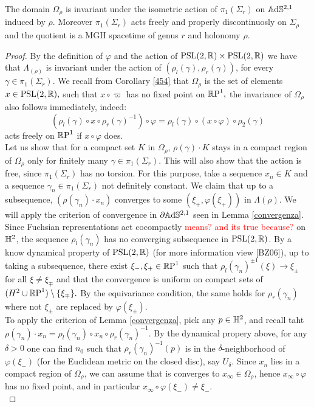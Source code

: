 \begin{proposition}\label{examplesgenustwo}
    The domain $\Omega_\rho$ is invariant under the isometric action of $\pi_1(\Sigma_r)$ on $\A^{2,1}$ induced by $\rho.$ Moreover $\pi_1(\Sigma_r)$ acts freely and properly discontinuosly on $\Sigma_\rho$ and the quotient is a MGH spacetime of genus $r$ and holonomy $\rho.$ 
\end{proposition}
\begin{proof}
    By the definition of $\varphi$ and the action of $\PSL\times\PSL$ we have that $\Lambda_(\rho)$ is invariant under the action of $(\rho_l(\gamma),\rho_r(\gamma))$, for every $\gamma\in\pi_1(\Sigma_r).$ We recall from Corollary \ref{454} that $\Omega_\rho$ is the set of elements $x\in\PSL,$ such that $x\circ\varpi$ has no fixed point on $\S,$ the invariance of $\Omega_\rho$ also follows immediately, indeed: 
    \[
        (\rho_l(\gamma)\circ x\circ \rho_r(\gamma)^{-1})\circ \varphi = \rho_l(\gamma)\circ (x\circ\varphi)\circ\rho_2(\gamma)
    \]
    acts freely on $\S$ if $x\circ\varphi$ does. \\
    Let us show that for a compact set $K$ in $\Omega_\rho$, $\rho(\gamma)\cdot K$ stays in a compact region of $\Omega_{\rho}$ only for finitely many $\gamma\in\pi_1(\Sigma_r).$  This will also show that the action is free, since $\pi_1(\Sigma_r)$ has no torsion. For this purpose, take a sequence $x_n\in K$ and a sequence $\gamma_n\in \pi_1(\Sigma_r)$ not definitely constant. We claim that up to a subsequence, $(\rho(\gamma_n)\cdot x_n)$ converges to some $(\xi_+,\varphi(\xi_+))$ in $\Lambda(\rho).$ We will apply the criterion of convergence in $\partial\A^{2,1}$ seen in Lemma \ref{convergenza}.\\
    Since Fuchsian representations act cocompactly \textcolor{red}{means? and its true because?} on $\H^2$, the sequence $\rho_l(\gamma_n)$ has no converging subsequence in $\PSL$. By a know dynamical property of $\PSL$ (for more information view [BZ06]), up to taking a subsequence, there exist $\xi_-,\xi_+\in\S$ such that $\rho_l(\gamma_n)^{\pm 1}(\xi)\to\xi_{\pm}$ for all $\xi\neq \xi_{\mp}$ and that the convergence is uniform on compact sets of $(H^2\cup\S)\setminus\{\xi_{\mp}\}.$ By the equivariance condition, the same holds for $\rho_r(\gamma_n)$ where not $\xi_\pm$ are replaced by $\varphi(\xi_\pm).$\\
    To apply the criterion of Lemma \ref{convergenza}, pick any $p\in\H^2$, and recall taht $\rho(\gamma_n)\cdot x_n=\rho_l(\gamma_n)\circ x_n\circ \rho_r(\gamma_n)^{-1}.$ By the dynamical propery above, for any $\delta>0$ one can find $n_0$ such that $\rho_r(\gamma_{n})^{-1}(p)$ is in the $\delta$-neighborhood of $\varphi(\xi_-)$ (for the Euclidean metric on the closed disc), say $U_\delta$. Since $x_n$ lies in a compact region of $\Omega_\rho$, we can assume that is converges to $x_\infty \in \Omega_\rho$, hence $x_\infty\circ\varphi$ has no fixed point, and in particular $x_\infty\circ\varphi(\xi_-)\neq \xi_-.$\\

\end{proof}
